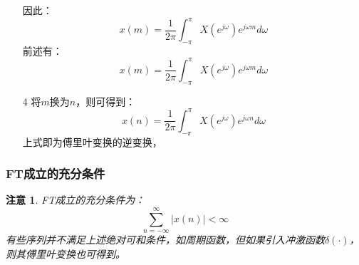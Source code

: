 \documentclass[notheorems,compress,mathserif,table]{beamer}
\newtheorem{zhuyi}{注意}
\begin{document}
\begin{frame}[allowframebreaks]
\begin{enumerate}
因此：
\begin{equation*}
x(m) = \frac{1}{2\pi}\int_{-\pi}^{\pi}X(e^{j\omega})e^{j\omega m}d\omega
\end{equation*}
\newpage
前述有：
\begin{equation*}
x(m) = \frac{1}{2\pi}\int_{-\pi}^{\pi}X(e^{j\omega})e^{j\omega m}d\omega
\end{equation*}
\newline
\item [4] 将$m$换为$n$，则可得到：
\begin{equation*}
x(n) = \frac{1}{2\pi}\int_{-\pi}^{\pi}X(e^{j\omega})e^{j\omega n}d\omega
\end{equation*}
上式即为傅里叶变换的逆变换，
\end{enumerate}
\end{frame}

\begin{frame}[shrink]\frametitle{FT成立的充分条件}%
\begin{zhuyi}
FT成立的充分条件为：
\begin{equation*}
\sum_{n=-\infty}^{\infty}|x(n)| <\infty
\end{equation*}
有些序列并不满足上述绝对可和条件，如周期函数，但如果引入冲激函数$\delta(\cdot)$，则其傅里叶变换也可得到。
\end{zhuyi}



\end{frame}
\end{document}

